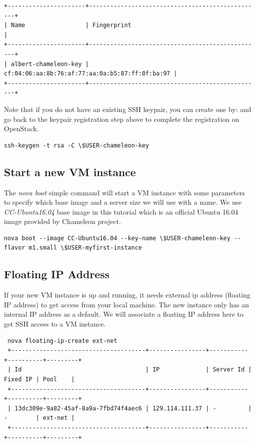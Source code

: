 \begin{lstlisting}
+----------------------+-------------------------------------------------+
| Name                 | Fingerprint                                     |
+----------------------+-------------------------------------------------+
| albert-chameleon-key | cf:04:06:aa:8b:76:af:77:aa:0a:b5:87:ff:0f:ba:97 |
+----------------------+-------------------------------------------------+
\end{lstlisting}

Note that if you do not have an existing SSH keypair, you can create one by:
and go back to the keypair registration step above to complete the registration
on OpenStack.

\begin{lstlisting}
ssh-keygen -t rsa -C \$USER-chameleon-key
\end{lstlisting}


\subsection{Start a new VM instance}
The \textit{nova boot} simple command will start a VM instance with some
parameters to specify which base image and a server size we will use with a
name. We use \textit{CC-Ubuntu16.04} base image in this tutorial which is an official Ubuntu 16.04 image provided by Chameleon project.

\begin{lstlisting}
nova boot --image CC-Ubuntu16.04 --key-name \$USER-chameleon-key --flavor m1.small \$USER-myfirst-instance
\end{lstlisting}

\subsection{Floating IP Address}
If your new VM instance is up and running, it needs external ip address
(floating IP address) to get access from your local machine. The new instance
only has an internal IP address as a default. We will associate a floating IP
address here to get SSH access to a VM instance.

\begin{lstlisting}
 nova floating-ip-create ext-net
 +--------------------------------------+----------------+-----------+----------+---------+
 | Id                                   | IP             | Server Id | Fixed IP | Pool    |
 +--------------------------------------+----------------+-----------+----------+---------+
 | 13dc309e-9a82-45af-8a9a-7fbd74f4aec6 | 129.114.111.37 | -         | -        | ext-net |
 +--------------------------------------+----------------+-----------+----------+---------+
\end{lstlisting}

